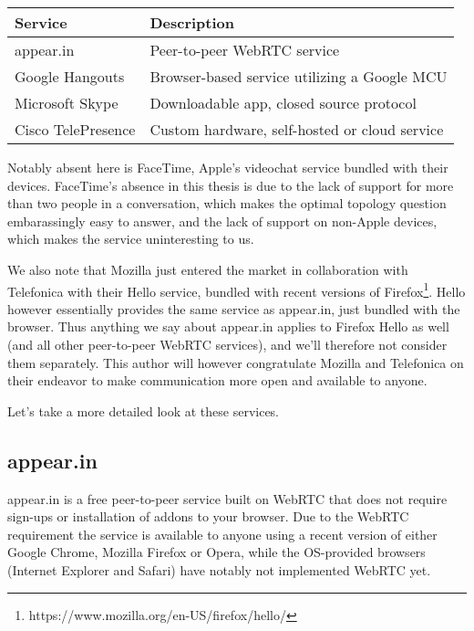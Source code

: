 \begin{center}
	\label{tab:existing-solutions}
	\begin{tabular}{| l | l |}
		\hline
		\textbf{Service} & \textbf{Description} \\ \hline
		appear.in & Peer-to-peer WebRTC service \\ \hline
		Google Hangouts & Browser-based service utilizing a Google MCU \\ \hline
		Microsoft Skype & Downloadable app, closed source protocol \\ \hline
		Cisco TelePresence & Custom hardware, self-hosted or cloud service \\ \hline
	\end{tabular}
\end{center}

Notably absent here is FaceTime, Apple's videochat service bundled with their devices. FaceTime's absence in this thesis is due to the lack of support for more than two people in a conversation, which makes the optimal topology question embarassingly easy to answer, and the lack of support on non-Apple devices, which makes the service uninteresting to us.

We also note that Mozilla just entered the market in collaboration with Telefonica with their Hello service, bundled with recent versions of Firefox\footnote{https://www.mozilla.org/en-US/firefox/hello/}. Hello however essentially provides the same service as appear.in, just bundled with the browser. Thus anything we say about appear.in applies to Firefox Hello as well (and all other peer-to-peer WebRTC services), and we'll therefore not consider them separately. This author will however congratulate Mozilla and Telefonica on their endeavor to make communication more open and available to anyone.

Let's take a more detailed look at these services.

\subsection{appear.in}

appear.in is a free peer-to-peer service built on WebRTC that does not require sign-ups or installation of addons to your browser. Due to the WebRTC requirement the service is available to anyone using a recent version of either Google Chrome, Mozilla Firefox or Opera, while the OS-provided browsers (Internet Explorer and Safari) have notably not implemented WebRTC yet.

